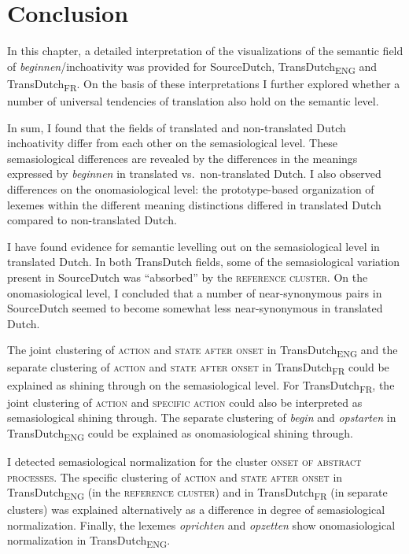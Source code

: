 \section{Conclusion}\label{sec:4.8}  
In this chapter, a detailed interpretation of the visualizations of the semantic field of \textit{beginnen}/inchoativity was provided for SourceDutch, TransDutch\textsubscript{ENG} and TransDutch\textsubscript{FR}. On the basis of these interpretations I further explored whether a number of universal tendencies of translation also hold on the semantic level. 

In sum, I found that the fields of translated and non-translated Dutch inchoativity differ from each other on the semasiological level. These semasiological differences are revealed by the differences in the meanings expressed by \textit{beginnen} in translated vs.\ non-translated Dutch. I also observed differences on the onomasiological level: the prototype-based organization of lexemes within the different meaning distinctions differed in translated Dutch compared to non-translated Dutch.

I have found evidence for semantic levelling out on the semasiological level in translated Dutch. In both TransDutch fields, some of the semasiological variation present in SourceDutch was ``absorbed'' by the \textsc{reference cluster}. On the onomasiological level, I concluded that a number of near-synonymous pairs in SourceDutch seemed to become somewhat less near-synonymous in translated Dutch.

The joint clustering of \textsc{action} and \textsc{state after onset} in TransDutch\textsubscript{ENG} and the separate clustering of \textsc{action} and \textsc{state after onset} in TransDutch\textsubscript{FR} could be explained as shining through on the semasiological level. For TransDutch\textsubscript{FR}, the joint clustering of \textsc{action} and {\textsc{specific}} \textsc{action} could also be interpreted as semasiological shining through. The separate clustering of \textit{begin} and \textit{opstarten} in TransDutch\textsubscript{ENG} could be explained as onomasiological shining through.

I detected semasiological normalization for the cluster {\textsc{onset of abstract processes}}. The specific clustering of \textsc{action} and \textsc{state after onset} in TransDutch\textsubscript{ENG} (in the \textsc{reference cluster}) and in TransDutch\textsubscript{FR} (in separate clusters) was explained alternatively as a difference in degree of semasiological normalization. Finally, the lexemes \textit{oprichten} and \textit{opzetten} show onomasiological normalization in TransDutch\textsubscript{ENG}.

